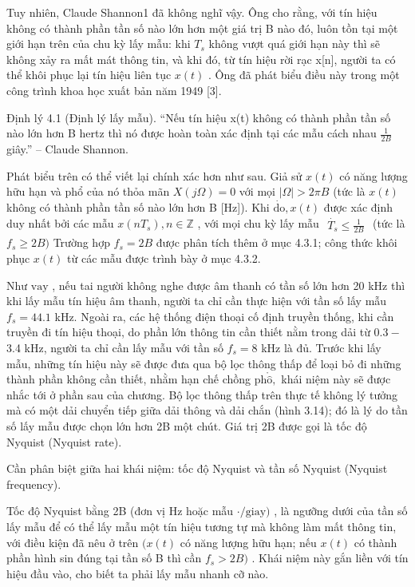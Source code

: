 \documentclass[
  10
]{article}
\begin{document}
Tuy nhiên, Claude Shannon1 đã không nghĩ vậy. Ông cho rằng, với tín hiệu
không có thành phần tần số nào lớn hơn một giá trị B nào đó, luôn tồn
tại một giới hạn trên của chu kỳ lấy mẫu: khi \(T _ { s }\) không vượt
quá giới hạn này thì sẽ không xảy ra mất mát thông tin, và khi đó, từ
tín hiệu rời rạc x{[}n{]}, người ta có thể khôi phục lại tín hiệu liên
tục \(x ( t )\) . Ông đã phát biểu điều này trong một công trình khoa
học xuất bản năm 1949 {[}3{]}.

Định lý 4.1 (Định lý lấy mẫu). ``Nếu tín hiệu x(t) không có thành phần
tần số nào lớn hơn B hertz thì nó được hoàn toàn xác định tại các mẫu
cách nhau \(\scriptstyle { \frac { 1 } { 2 B } }\) giây.'' -- Claude
Shannon.

Phát biểu trên có thể viết lại chính xác hơn như sau. Giả sử \(x ( t )\)
có năng lượng hữu hạn và phổ của nó thỏa mãn \(X ( j \Omega ) = 0\) với
mọi \(| \Omega | > 2 \pi B\) (tức là \(x ( t )\) không có thành phần tần
số nào lớn hơn B {[}Hz{]}). Khi \(\dot { \mathrm { d o } } , x ( t )\)
được xác định duy nhất bởi các mẫu
\(x ( n T _ { s } ) , n \in \mathbb { Z }\) , với mọi chu kỳ lấy mẫu
\(\begin{array} { r } { \dot { T _ { s } } \le \frac { 1 } { 2 B } } \end{array}\)
(tức là \(f _ { s } \geq 2 B )\) Trường hợp \(f _ { s } = 2 B\) được
phân tích thêm ở mục 4.3.1; công thức khôi phục \(x ( t )\) từ các mẫu
được trình bày ở mục 4.3.2.

Như \(\mathrm { v a y }\) , nếu tai người không nghe được âm thanh có
tần số lớn hơn 20 kHz thì khi lấy mẫu tín hiệu âm thanh, người ta chỉ
cần thực hiện với tần số lấy mẫu \(f _ { s } = 4 4 . 1\) kHz. Ngoài ra,
các hệ thống điện thoại cố định truyền thống, khi cần truyền đi tín hiệu
thoại, do phần lớn thông tin cần thiết nằm trong dải từ \(0 . 3 -\) 3.4
kHz, người ta chỉ cần lấy mẫu với tần số \(f _ { s } = 8\) kHz là đủ.
Trước khi lấy mẫu, những tín hiệu này sẽ được đưa qua bộ lọc thông thấp
để loại bỏ đi những thành phần không cần thiết, nhằm hạn chế chồng
\(\mathrm { p h } \mathring { \hat { \mathrm { o } } } ,\) khái niệm này
sẽ được nhắc tới ở phần sau của chương. Bộ lọc thông thấp trên thực tế
không lý tưởng mà có một dải chuyển tiếp giữa dải thông và dải chắn
(hình 3.14); đó là lý do tần số lấy mẫu được chọn lớn hơn 2B một chút.
Giá trị 2B được gọi là tốc độ Nyquist (Nyquist rate).

Cần phân biệt giữa hai khái niệm: tốc độ Nyquist và tần số Nyquist
(Nyquist frequency).

Tốc độ Nyquist bằng 2B (đơn vị Hz hoặc mẫu
\(\cdot / \mathrm { g i a y } )\) , là ngưỡng dưới của tần số lấy mẫu để
có thể lấy mẫu một tín hiệu tương tự mà không làm mất thông tin, với
điều kiện đã nêu ở trên \(( x ( t )\) có năng lượng hữu hạn; nếu
\(x ( t )\) có thành phần hình sin đúng tại tần số B thì cần
\(f _ { s } > 2 B )\) . Khái niệm này gắn liền với tín hiệu đầu vào, cho
biết ta phải lấy mẫu nhanh cỡ nào.
\end{document}
